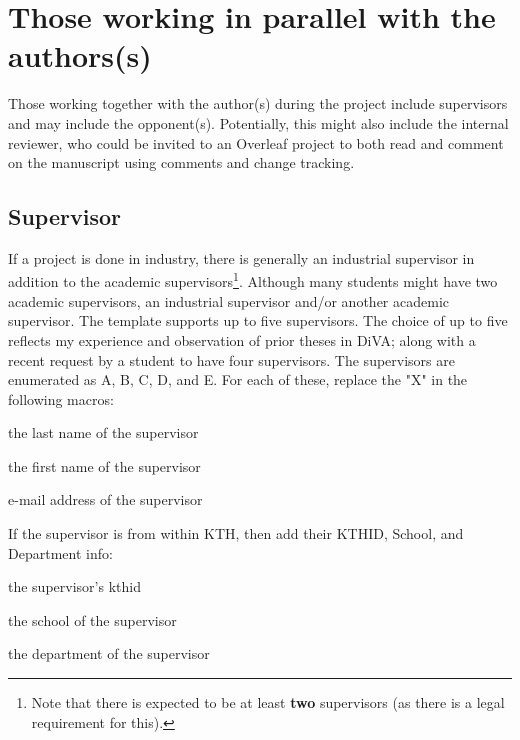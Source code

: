 \documentclass[12pt, twoside]{article}
\begin{document}
\section[Those working in parallel with the authors(s)]{Those working in parallel with the authors(s)}
\label{sec:examinerAdvisorsOpponent}
Those working together with the author(s) during the project include supervisors and may include the opponent(s). Potentially, this might also include the internal reviewer, who could be invited to an Overleaf project to both read and comment on the manuscript using comments and change tracking.

\subsection{Supervisor}
\label{sec:supervisorMacros}
If a project is done in industry, there is generally an industrial supervisor in addition to the academic supervisors\footnote{Note that there is expected to be at least \textbf{two} supervisors (as there is a legal requirement for this).}. Although many students might have two academic supervisors, an industrial supervisor and/or another academic supervisor. The template supports up to five supervisors. The choice of up to five reflects my experience and observation of prior theses in \gls{DiVA}; along with a recent request by a student to have four supervisors. The supervisors are enumerated as A, B, C, D, and E. For each of these, replace the "X" in the following macros:
\begin{description}[leftmargin=!, labelwidth =\widthof{\texttt{\textbackslash secondAuthorsFirstname\{\}}}]
\item [\texttt{\textbackslash supervisorXsLastname\{\}}] the last name of the supervisor
\item [\texttt{\textbackslash supervisorXsFirstname\{\}}] the first name of the supervisor
\item [\texttt{\textbackslash supervisorXsEmail\{\}}] e-mail address of the supervisor
\end{description}

If the supervisor is from within \gls{KTH}, then add their KTHID, School, and Department info:
\begin{description}[leftmargin=!, labelwidth =\widthof{\texttt{\textbackslash secondAuthorsFirstname\{\}}}]
\item [\texttt{\textbackslash supervisorXsKTHID\{\}}] the supervisor's kthid 
\item [\texttt{\textbackslash supervisorXsSchool\{\}}] the school of the supervisor
\item [\texttt{\textbackslash supervisorXsDepartment\{\}}] the department of the supervisor
\end{description}
\end{document}
